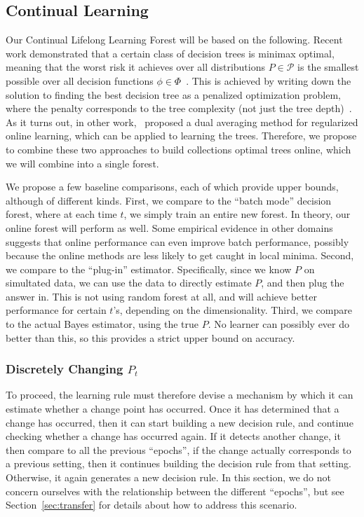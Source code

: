 \documentclass{article}
\begin{document}
\subsection{Continual Learning}

Our Continual Lifelong Learning Forest will be based on the following.  Recent work demonstrated that a certain class of decision trees is minimax optimal, meaning that the worst risk it achieves over all distributions $P \in \mathcal{P}$ is the smallest possible over all decision functions $\phi \in \Phi$~\cite{Scott2006}.  This is achieved by writing down the solution to finding the best decision tree as a penalized optimization problem, where the penalty corresponds to the tree complexity (not just the tree depth)~\cite{Scott2005}. As it turns out, in other work,~\citet{Xiao2010} proposed a dual averaging method for regularized online learning, which can be applied to learning the trees. Therefore, we propose to combine these two approaches to build collections optimal trees online, which we will combine into a single forest. 

We propose a few baseline comparisons, each of which provide upper bounds, although of different kinds.  First, we compare to the ``batch mode'' decision forest, where at each time $t$, we simply train an entire new forest.  In theory, our online forest will perform as well.  Some empirical evidence in other domains suggests that online performance can even improve batch performance, possibly because the online methods are less likely to get caught in local minima.  Second, we compare to the ``plug-in'' estimator.  Specifically, since we know $P$ on simultated data, we can use the data to directly estimate $P$, and then plug the answer in.  This is not using random forest at all, and will achieve better performance for certain $t$'s, depending on the dimensionality.  Third, we compare to the actual Bayes estimator, using the true $P$.  No learner can possibly ever do better than this, so this provides a strict upper bound on accuracy. 


\subsubsection{Discretely Changing $P_t$}

To proceed, the learning rule must therefore devise a mechanism by which it can estimate whether a change point has occurred. Once it has determined that a change has occurred, then it can start building a new decision rule, and continue checking whether a change has occurred again.  If it detects another change, it then compare to all the previous ``epochs'', if the change actually corresponds to a previous setting, then it continues building the decision rule from that setting.  Otherwise, it again generates a new decision rule. In this section, we do not concern ourselves with the relationship between the different ``epochs'', but see Section~\ref{sec:transfer} for details about how to address this scenario.   
\end{document}
